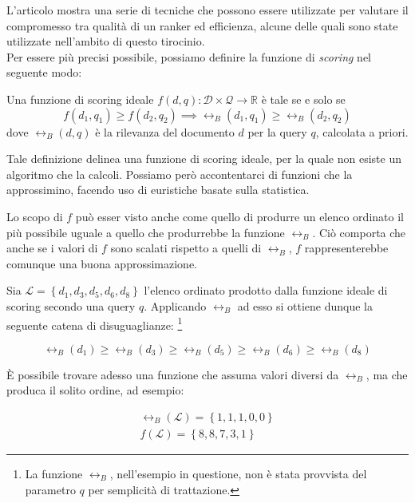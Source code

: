 L'articolo \cite{10.1016/j.ipm.2016.05.004} mostra una serie di tecniche che possono essere
utilizzate per valutare il compromesso tra qualità di un ranker ed efficienza, 
alcune delle quali sono state utilizzate nell'ambito di questo tirocinio.\\
Per essere più precisi possibile, possiamo definire la funzione di \textit{scoring} nel seguente modo:

\begin{definizione}\label{def:funzione_di_score_ideale}
	Una funzione di scoring ideale $f(d,q) : \mathcal{D} \times \mathcal{Q} \rightarrow \mathbb{R}$ è tale
	se e solo se
	$$
	f(d_1,q_1) \geq f(d_2, q_2) \implies \rel_B(d_1, q_1) \geq \rel_B(d_2, q_2)
	$$
dove $\rel_B(d,q)$ è la rilevanza del documento $d$ per la query $q$, calcolata a priori.	
\end{definizione}

Tale definizione delinea una funzione di scoring ideale, per la quale non esiste un algoritmo che
la calcoli. Possiamo però accontentarci di funzioni che la approssimino, facendo uso di euristiche basate sulla statistica.

Lo scopo di $f$ può esser visto anche come quello di produrre un elenco ordinato il più possibile uguale a quello
che produrrebbe la funzione $\rel_B$. Ciò comporta che anche se i valori di $f$ sono scalati rispetto a quelli di $\rel_B$,
$f$ rappresenterebbe comunque una buona approssimazione.

\begin{esempio}
	Sia $\mathcal{L}= \left\{d_1, d_3, d_5, d_6, d_8 \right\}$ l'elenco ordinato prodotto
	dalla funzione ideale di scoring secondo una query $q$. Applicando $\rel_B$ ad esso si ottiene dunque la seguente catena
	di disuguaglianze: \footnote{La funzione $\rel_B$, nell'esempio in questione, non è stata provvista del parametro $q$ per semplicità di trattazione.}
	
	$$
	\rel_B(d_1) \geq \rel_B(d_3) \geq \rel_B(d_5) \geq \rel_B(d_6) \geq  \rel_B(d_8)
	$$
	
	\`E possibile trovare adesso una funzione che assuma valori diversi da $\rel_B$, ma che produca il solito ordine,
	ad esempio:
	
	\begin{align*}
	\rel_B(\mathcal{L}) = \left\{1, 1, 1, 0, 0\right\} \\
	f(\mathcal{L}) = \left\{8, 8, 7, 3, 1\right\}
	\end{align*}
	
\end{esempio}


